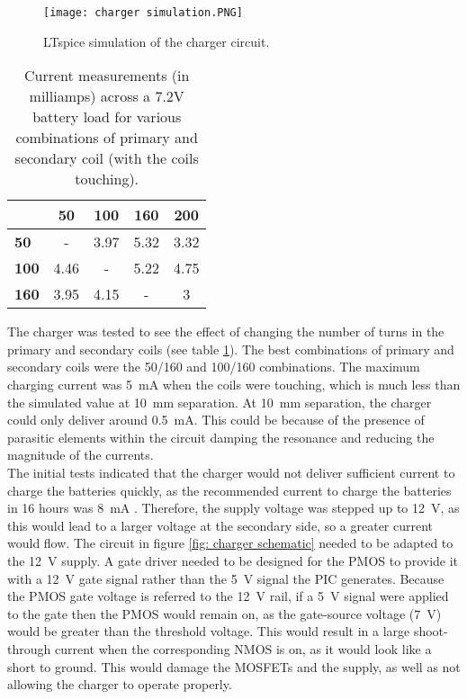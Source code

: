\begin{figure}[ht]
	\centering
	\texttt{[image: charger simulation.PNG]}
	\caption{LTspice simulation of the charger circuit.}
	\label{fig: charger simulation}
\end{figure}

\begin{table}[ht]
	\begin{center}
	\caption{Current measurements (in milliamps) across a 7.2V battery load for various combinations of primary and secondary coil (with the coils touching).}
	\label{tab: coil combinations}
	\begin{tabular}{|l|*{4}{c|}}
		\hline
		\backslashbox{\textbf{Primary Turns}}{\textbf{Secondary Turns}} & \textbf{50} & \textbf{100} & \textbf{160} & \textbf{200} \\
		\hline
		\textbf{50} & - & 3.97 & 5.32 & 3.32 \\
		\hline
		\textbf{100} & 4.46 & - & 5.22 & 4.75 \\
		\hline
		\textbf{160} & 3.95 & 4.15 & - & 3\\
		\hline
	\end{tabular}
	\end{center}
\end{table}

The charger was tested to see the effect of changing the number of turns in the primary and secondary coils (see table \ref{tab: coil combinations}). The best combinations of primary and secondary coils were the 50/160 and 100/160 combinations. The maximum charging current was \SI{5}{\milli\ampere} when the coils were touching, which is much less than the simulated value at \SI{10}{\milli\metre} separation. At \SI{10}{\milli\metre} separation, the charger could only deliver around \SI{0.5}{\milli\ampere}. This could be because of the presence of parasitic elements within the circuit damping the resonance and reducing the magnitude of the currents. \\ 



The initial tests indicated that the charger would not deliver sufficient current to charge the batteries quickly, as the recommended current to charge the batteries in 16 hours was \SI{8}{\milli\ampere} \cite{rs_pro_batteries}. Therefore, the supply voltage was stepped up to \SI{12}{\volt}, as this would lead to a larger voltage at the secondary side, so a greater current would flow. The circuit in figure \ref{fig: charger schematic} needed to be adapted to the \SI{12}{\volt} supply. A gate driver needed to be designed for the PMOS to provide it with a \SI{12}{\volt} gate signal rather than the \SI{5}{\volt} signal the PIC generates. Because the PMOS gate voltage is referred to the \SI{12}{\volt} rail, if a \SI{5}{\volt} signal were applied to the gate then the PMOS would remain on, as the gate-source voltage (\SI{7}{\volt}) would be greater than the threshold voltage. This would result in a large shoot-through current when the corresponding NMOS is on, as it would look like a short to ground. This would damage the MOSFETs and the supply, as well as not allowing the charger to operate properly. \\

